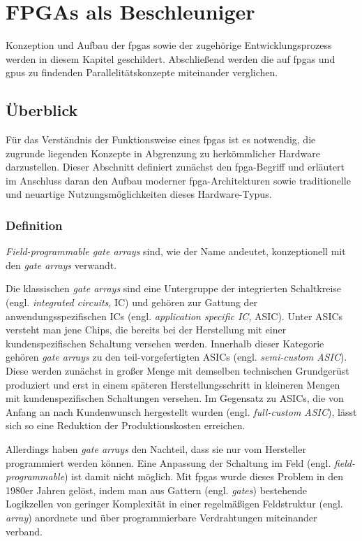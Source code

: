 \chapter{FPGAs als Beschleuniger}\label{fpga}

Konzeption und Aufbau der \gls{fpga}s sowie der zugehörige Entwicklungsprozess
werden in diesem Kapitel geschildert. Abschließend werden die auf \gls{fpga}s
und \gls{gpu}s zu findenden Parallelitätskonzepte miteinander verglichen.

\section{Überblick}\label{fpga:ueberblick}

Für das Verständnis der Funktionsweise eines \gls{fpga}s ist es notwendig, die
zugrunde liegenden Konzepte in Abgrenzung zu herkömmlicher Hardware
darzustellen. Dieser Abschnitt definiert zunächst den \gls{fpga}-Begriff und
erläutert im Anschluss daran den Aufbau moderner \gls{fpga}-Architekturen sowie
traditionelle und neuartige Nutzungsmöglichkeiten dieses Hardware-Typus.

\subsection{Definition}\label{fpga:ueberblick:definition}

\textit{Field-programmable gate arrays} sind, wie der Name andeutet,
konzeptionell mit den \textit{gate arrays} verwandt.

Die klassischen \textit{gate arrays} sind eine Untergruppe der integrierten
Schaltkreise (engl. \textit{integrated circuits}, IC) und gehören zur Gattung
der anwendungsspezifischen ICs (engl. \textit{application specific IC}, ASIC).
Unter ASICs versteht man jene Chips, die bereits bei der Herstellung mit einer
kundenspezifischen Schaltung versehen werden. Innerhalb dieser Kategorie gehören
\textit{gate arrays} zu den teil-vorgefertigten ASICs (engl.
\textit{semi-custom ASIC}). Diese werden zunächst in großer Menge mit demselben
technischen Grundgerüst produziert und erst in einem späteren
Herstellungsschritt in kleineren Mengen mit kundenspezifischen Schaltungen
versehen. Im Gegensatz zu ASICs, die von Anfang an nach Kundenwunsch hergestellt
wurden (engl. \textit{full-custom ASIC}), lässt sich so eine Reduktion der
Produktionskosten erreichen. \cite[vgl.][123]{kesel2013}

Allerdings haben \textit{gate arrays} den Nachteil, dass sie nur vom Hersteller
programmiert werden können. Eine Anpassung der Schaltung im Feld (engl.
\textit{field-programmable}) ist damit nicht möglich. Mit \gls{fpga}s wurde
dieses Problem in den 1980er Jahren gelöst, indem man aus Gattern
(engl. \textit{gates}) bestehende Logikzellen von geringer Komplexität in einer
regelmäßigen Feldstruktur (engl. \textit{array}) anordnete und über
programmierbare Verdrahtungen miteinander verband.
\cite[vgl.][208]{kesel2013} 

